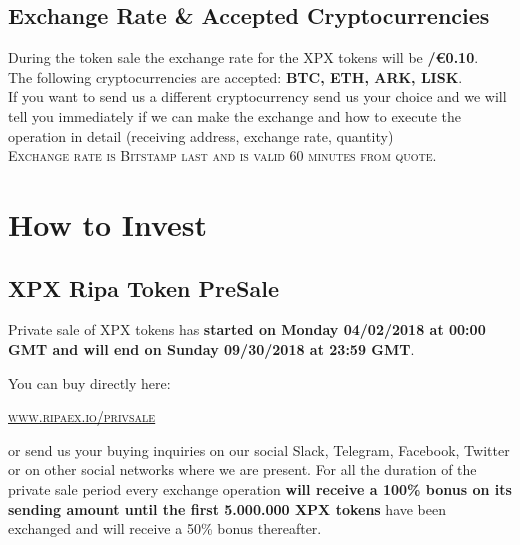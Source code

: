 \documentclass[11pt,fleqn,oneside]{book} %
\begin{document}
\subsection{Exchange Rate \& Accepted Cryptocurrencies}
During the token sale the exchange rate for the XPX tokens will be \textbf{\PHP/\euro0.10}.\\

The following cryptocurrencies are accepted: \textbf{BTC, ETH, ARK, LISK}.\\

If you want to send us a different cryptocurrency send us your choice and we will tell you immediately if we can make 
the exchange and how to execute the operation in detail (receiving address, exchange rate, quantity)\\

\textsc{Exchange rate is Bitstamp last and is valid 60 minutes from quote}.

\section{How to Invest}
\subsection{XPX Ripa Token PreSale}
Private sale of XPX tokens has \textbf{started on Monday 04/02/2018 at 00:00 GMT and will end on Sunday 09/30/2018 at 23:59 GMT}.

You can buy directly here: 
\begin{center}
	\href{https://www.ripaex.io/privsale}{\textsc{www.ripaex.io/privsale}}
\end{center}

or send us your buying inquiries on our social Slack, Telegram, Facebook, Twitter or on other social networks where we are present.
For all the duration of the private sale period every exchange operation \textbf{will receive a 100\% bonus on its sending amount
until the first 5.000.000 XPX tokens} have been exchanged and will receive a 50\% bonus thereafter.
\end{document}
